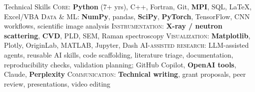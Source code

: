 {\small
\begin{rubric}{Technical Skills}
  \entry*[] \textsc{Core}: \textbf{Python} (7+ yrs), C++, Fortran, Git, \textbf{MPI}, SQL, LaTeX, Excel/VBA
  \entry*[] \textsc{Data \& ML}: \textbf{NumPy}, pandas, \textbf{SciPy}, \textbf{PyTorch}, TensorFlow, CNN workflows, scientific image analysis
  \entry*[] \textsc{Instrumentation}: \textbf{X-ray / neutron scattering}, \textbf{CVD}, PLD, SEM, Raman spectroscopy
  \entry*[] \textsc{Visualization}: \textbf{Matplotlib}, Plotly, OriginLab, MATLAB, Jupyter, Dash
  \entry*[] \textsc{AI-assisted research}: LLM-assisted agents, reusable AI skills, code scaffolding, literature triage, documentation, reproducibility checks, validation planning; GitHub Copilot, \textbf{OpenAI tools}, Claude, \textbf{Perplexity}
  \entry*[] \textsc{Communication}: \textbf{Technical writing}, grant proposals, peer review, presentations, video editing
\end{rubric}
}
